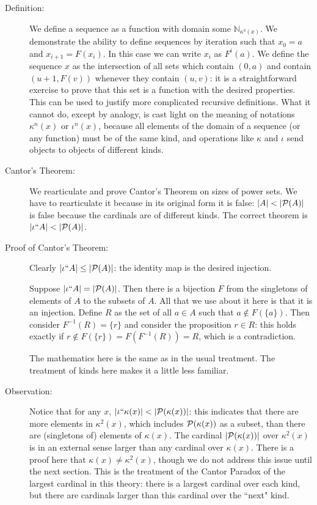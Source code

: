 \documentclass[12pt]{article}
\begin{document}
\begin{description}
\item[Definition:]  We define a sequence as a function with domain some ${\mathbb N}_{\kappa^3(x)}$.   We demonstrate the ability to define sequences by iteration such that $x_0 = a$ and $x_{i+1} = F(x_i)$.  In this case we can write $x_i$ as $F^i(a)$.  We define the sequence $x$ as the intersection of all sets which contain $(0,a)$ and contain $(u+1,F(v))$ whenever they contain $(u,v)$:  it is a straightforward exercise to prove that this set is a function with the desired properties.  This can be used to justify more complicated recursive definitions.  What it cannot do, except by analogy, is cast light on the meaning of notations $\kappa^n(x)$ or $\iota^n(x)$, because all elements of the domain of a sequence (or any function) must be of the same kind, and operations like $\kappa$ and $\iota$ send objects to objects of different kinds.

\item[Cantor's Theorem:]  We rearticulate and prove Cantor's Theorem on sizes of power sets.  We have to rearticulate it because in its original form it is false:  $|A| < |{\cal P}(A)|$ is false because the cardinals are of different kinds.  The correct theorem is $|\iota``A|<|{\cal P}(A)|$.

\item[Proof of Cantor's Theorem:]  Clearly $|\iota``A| \leq |{\cal P}(A)|$:  the identity map is the desired injection.

Suppose  $|\iota``A| = |{\cal P}(A)|$.  Then there is a bijection $F$ from the singletons of elements of $A$ to the subsets of $A$.
All that we use about it here is that it is an injection.
Define $R$ as the set of all $a \in A$ such that $a \not\in F(\{a\})$.  Then consider $F^{-1}(R) = \{r\}$ and consider the proposition $r \in R$:  this holds exactly if
$r \not\in F(\{r\})  = F(F^{-1}(R)) = R$, which is a contradiction.

The mathematics here is the same as in the usual treatment.  The treatment of kinds here makes it a little less familiar.

\item[Observation:]   Notice that for any $x$, $|\iota``\kappa(x)| < |{\cal P}(\kappa(x))|$:  this indicates that there are more elements in $\kappa^2(x)$, which includes ${\cal P}(\kappa(x))$ as a subset, than there are (singletons of) elements of $\kappa(x)$.  The cardinal $|{\cal P}(\kappa(x))|$ over $\kappa^2(x)$ is in an external sense larger than any cardinal over $\kappa(x)$.  There is a proof here that $\kappa(x) \neq \kappa^2(x)$, though we do not address this issue until the next section.  This is the treatment of the Cantor Paradox of the largest cardinal in this theory:  there is a largest cardinal
over each kind, but there are cardinals larger than this cardinal over the ``next" kind.


\end{description}
\end{document}
